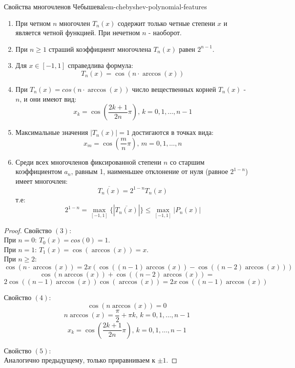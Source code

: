 \documentclass[14pt]{extarticle}
\begin{document}
    \begin{lemma}{Свойства многочленов Чебышева}{lem-chebyshev-polynomial-features}
        \begin{enumerate}
            \item При четном $n$ многочлен $T_{n}(x)$ содержит только четные степени $x$ и является четной функцией. При нечетном $n$ - наоборот.
            \item При $n \geq 1$ страший коэффициент многочлена $T_{n}(x)$ равен $2^{n - 1}$.
            \item Для $x \in [-1, 1]$ справедлива формула: 
                  $$T_{n}(x) = \cos(n \cdot \arccos(x))$$
            \item При $T_{n}(x) = cos(n \cdot \arccos(x))$ число вещественных корней $T_{n}(x)$ - $n$, и они имеют вид:
                  $$x_{k} = \cos(\frac{2k + 1}{2n}\pi) \text{, } k = 0, 1, \ldots, n-1$$
            \item Максимальные значения $|T_{n}(x)| = 1$ достигаются в точках вида:
                  $$x_{m} = \cos(\frac{m}{n}\pi) \text{, } m = 0, 1, \ldots, n$$
            \item Среди всех многочленов фиксированной степени $n$ со старшим коэффициентом $a_{n}$, равным 1, наименьшее отклонение от нуля (равное $2^{1 - n}$) имеет многочлен:
                  $$\overline{T_{n}(x)} = 2^{1-n}T_{n}(x)$$
                  т.е: $$2^{1 - n} = \max_{[-1, 1]}\{|\overline{T_{n}(x)}|\} \leq \max_{[-1, 1]}|P_{n}(x)|$$
        \end{enumerate}

        \begin{proof}
            Свойство $(3)$:\\
            При $n = 0$: $T_{0}(x) = cos(0) = 1$.\\
            При $n = 1$: $T_{1}(x) = \cos(\arccos(x)) = x$.\\
            При $n \geq 2$: $$\cos(n \cdot \arccos(x)) = 2x(\cos((n - 1)\arccos(x)) - \cos((n - 2)\arccos(x)))$$
            $$\cos(n \arccos(x)) + \cos((n - 2)\arccos(x)) = $$ $$2\cos((n - 1) \arccos(x))\cos(\arccos(x)) = 2x\cos((n-1)\arccos(x))$$
        
            \vspace{\baselineskip}

            Свойство $(4)$:
            $$\cos(n \arccos(x)) = 0$$
            $$n\arccos(x) = \frac{\pi}{2} + \pi k \text{, } k = 0, 1, \ldots, n-1$$
            $$x_{k} = \cos(\frac{2k + 1}{2n}\pi) \text{, } k = 0, 1, \ldots, n-1$$

            \vspace{\baselineskip}

            Свойство $(5)$:\\
            Аналогично предыдущему, только приравниваем к $\pm1$.
        \end{proof}
    \end{lemma}
\end{document}
